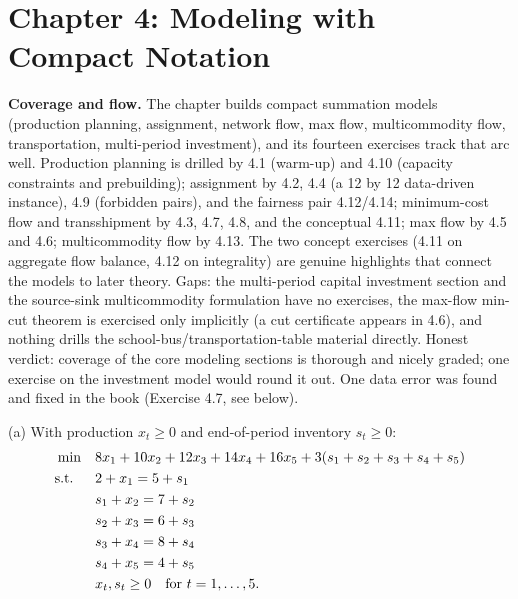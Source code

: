 \section{Chapter 4: Modeling with Compact Notation}

\textbf{Coverage and flow.} The chapter builds compact summation models (production planning, assignment, network flow, max flow, multicommodity flow, transportation, multi-period investment), and its fourteen exercises track that arc well. Production planning is drilled by 4.1 (warm-up) and 4.10 (capacity constraints and prebuilding); assignment by 4.2, 4.4 (a 12 by 12 data-driven instance), 4.9 (forbidden pairs), and the fairness pair 4.12/4.14; minimum-cost flow and transshipment by 4.3, 4.7, 4.8, and the conceptual 4.11; max flow by 4.5 and 4.6; multicommodity flow by 4.13. The two concept exercises (4.11 on aggregate flow balance, 4.12 on integrality) are genuine highlights that connect the models to later theory. Gaps: the multi-period capital investment section and the source-sink multicommodity formulation have no exercises, the max-flow min-cut theorem is exercised only implicitly (a cut certificate appears in 4.6), and nothing drills the school-bus/transportation-table material directly. Honest verdict: coverage of the core modeling sections is thorough and nicely graded; one exercise on the investment model would round it out. One data error was found and fixed in the book (Exercise 4.7, see below).


(a) With production $x_t \geq 0$ and end-of-period inventory $s_t \geq 0$:
\begin{align*}
\min \quad & 8x_1 + 10x_2 + 12x_3 + 14x_4 + 16x_5 + 3(s_1 + s_2 + s_3 + s_4 + s_5)\\
\text{s.t.}\;\; \quad & 2 + x_1 = 5 + s_1\\
& s_1 + x_2 = 7 + s_2\\
& s_2 + x_3 = 6 + s_3\\
& s_3 + x_4 = 8 + s_4\\
& s_4 + x_5 = 4 + s_5\\
& x_t, s_t \geq 0 \quad \text{for } t = 1, \dots, 5.
\end{align*}

